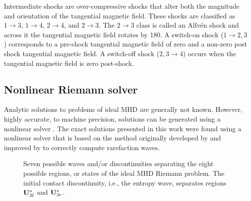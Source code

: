 Intermediate shocks are over-compressive shocks that alter both the magnitude and orientation of the tangential magnetic field.  These shocks are classified as $1\rightarrow 3$, $1\rightarrow 4$, $2\rightarrow 4$, and $2\rightarrow 3$.  The $2\rightarrow 3$ class is called an Alfv{\'e}n shock and across it the tangential magnetic field rotates by 180\degree.  A switch-on shock ($1 \rightarrow 2,3$) corresponds to a pre-shock tangential magnetic field of zero and a non-zero post shock tangential magnetic field.  A switch-off shock ($2,3 \rightarrow 4$) occurs when the tangential magnetic field is zero post-shock.  

\subsection[Nonlinear Riemann solver]{Nonlinear Riemann solver}
\label{sec:mhd_exact}

Analytic solutions to problems of ideal MHD are generally not known.  However, highly accurate, to machine precision, solutions can be generated using a nonlinear solver \citep{Dai:1994a,Ryu:1995a,Torrilhon:2002}.  The exact solutions presented in this work were found using a nonlinear solver that is based on the method originally developed by \citet{Dai:1994a} and improved by \citet{Ryu:1995a} to correctly compute rarefaction waves.  

\begin{figure}[htbp]
\begin{center}

\end{center}
\caption{Seven possible waves and/or discontinuities separating the eight possible regions, or states of the ideal MHD Riemann problem.  The initial contact discontinuity, i.e., the entropy wave, separates regions $\mathbf{U}^*_{3l}$ and $\mathbf{U}^*_{3r}$.}
\label{fig:mhd_states}
\end{figure}

